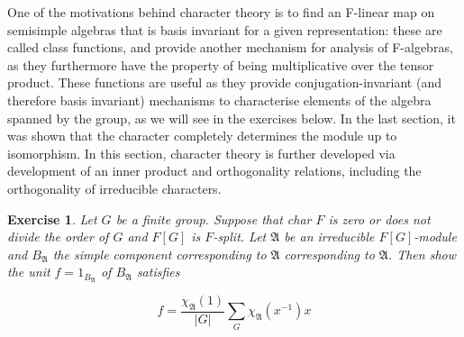 \documentclass{article}
\newtheorem{exercise}{Exercise}[section]
\begin{document}
One of the motivations behind character theory is to find an F-linear map on semisimple algebras that is basis invariant for a given representation: these are called class functions, and provide another mechanism for analysis of F-algebras, as they furthermore have the property of being multiplicative over the tensor product. These functions are useful as they provide conjugation-invariant (and therefore basis invariant) mechanisms to characterise elements of the algebra spanned by the group, as we will see in the exercises below. In the last section, it was shown that the character completely determines the module up to isomorphism. In this section, character theory is further developed via development of an inner product and orthogonality relations, including the orthogonality of irreducible characters. 
\begin{exercise}
  Let $G$ be a finite group. Suppose that char $F$ is zero or does not divide the order of $G$ and $F[G]$ is $F$-split. Let
$\mathfrak{A}$ be an irreducible  $F[G]$-module and $B_{\mathfrak{A}}$ the simple component corresponding to $\mathfrak{A}$
corresponding to $\mathfrak{A}$. Then show the unit $f = 1_{B_{\mathfrak{A}}}$ of $B_{\mathfrak{A}}$ satisfies

\[
  f = \frac{\chi_{\mathfrak{A}}(1)}{|G|} \sum_{G}\chi_{\mathfrak{A}}(x^{-1})x 
\]
\end{exercise}
\end{document}
